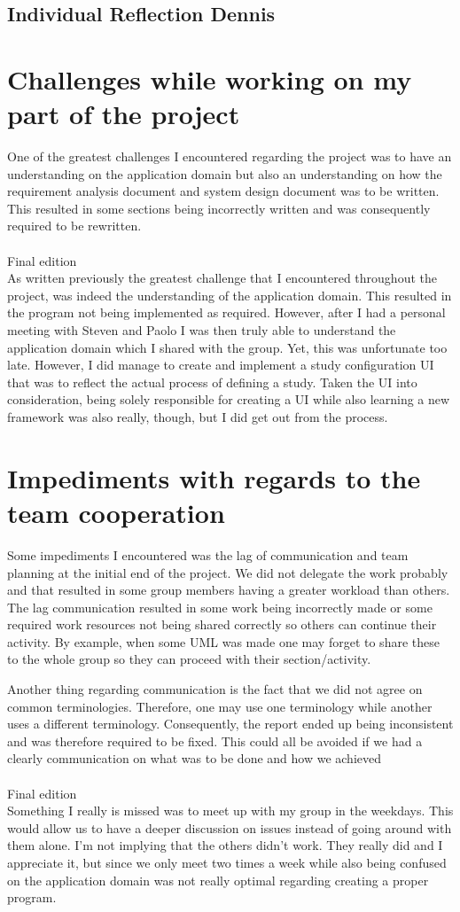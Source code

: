 \subsection{Individual Reflection Dennis}
\section{Challenges while working on my part of the project}
One of the greatest challenges I encountered regarding the project was to have an understanding on the application domain but also an understanding on how the requirement analysis document and system design document was to be written. This resulted in some sections being incorrectly written and was consequently required to be rewritten.\\\\
Final edition\\
As written previously the greatest challenge that I encountered throughout the project, was indeed the understanding of the application domain. This resulted in the program not being implemented as required. However, after I had a personal meeting with Steven and Paolo I was then truly able to understand the application domain which I shared with the group. Yet, this was unfortunate too late. However, I did manage to create and implement a study configuration UI that was to reflect the actual process of defining a study. Taken the UI into consideration, being solely responsible for creating a UI while also learning a new framework was also really, though, but I did get out from the process.

\section{Impediments with regards to the team cooperation}
Some impediments I encountered was the lag of communication and team planning at the initial end of the project. We did not delegate the work probably and that resulted in some group members having a greater workload than others. The lag communication resulted in some work being incorrectly made or some required work resources not being shared correctly so others can continue their activity. By example, when some UML was made one may forget to share these to the whole group so they can proceed with their section/activity.

Another thing regarding communication is the fact that we did not agree on common terminologies. Therefore, one may use one terminology while another uses a diﬀerent terminology. Consequently, the report ended up being inconsistent and was therefore required to be ﬁxed. This could all be avoided if we had a clearly communication on what was to be done and how we achieved\\\\
Final edition \\
Something I really is missed was to meet up with my group in the weekdays. This would allow us to have a deeper discussion on issues instead of going around with them alone. I'm not implying that the others didn't work. They really did and I appreciate it, but since we only meet two times a week while also being confused on the application domain was not really optimal regarding creating a proper program.


